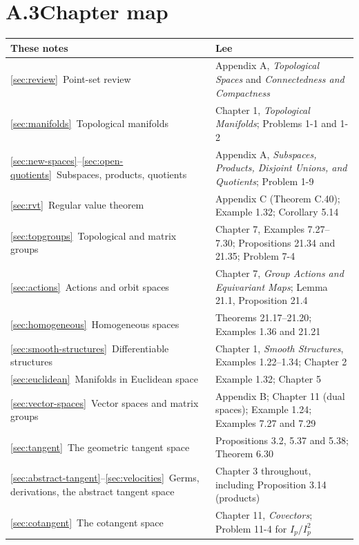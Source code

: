 \documentclass[11pt]{report}
\begin{document}
\section*{A.3\quad Chapter map}

\begin{longtable}{>{\raggedright\arraybackslash}p{6.4cm} >{\raggedright\arraybackslash}p{8.4cm}}
\toprule
\textbf{These notes} & \textbf{Lee} \\ \midrule \endhead
\ref{sec:review}\ Point-set review & Appendix A, \emph{Topological Spaces} and \emph{Connectedness and Compactness} \\
\ref{sec:manifolds}\ Topological manifolds & Chapter 1, \emph{Topological Manifolds}; Problems 1-1 and 1-2 \\
\ref{sec:new-spaces}--\ref{sec:open-quotients}\ Subspaces, products, quotients & Appendix A, \emph{Subspaces, Products, Disjoint Unions, and Quotients}; Problem 1-9 \\
\ref{sec:rvt}\ Regular value theorem & Appendix C (Theorem C.40); Example 1.32; Corollary 5.14 \\
\ref{sec:topgroups}\ Topological and matrix groups & Chapter 7, Examples 7.27--7.30; Propositions 21.34 and 21.35; Problem 7-4 \\
\ref{sec:actions}\ Actions and orbit spaces & Chapter 7, \emph{Group Actions and Equivariant Maps}; Lemma 21.1, Proposition 21.4 \\
\ref{sec:homogeneous}\ Homogeneous spaces & Theorems 21.17--21.20; Examples 1.36 and 21.21 \\
\ref{sec:smooth-structures}\ Differentiable structures & Chapter 1, \emph{Smooth Structures}, Examples 1.22--1.34; Chapter 2 \\
\ref{sec:euclidean}\ Manifolds in Euclidean space & Example 1.32; Chapter 5 \\
\ref{sec:vector-spaces}\ Vector spaces and matrix groups & Appendix B; Chapter 11 (dual spaces); Example 1.24; Examples 7.27 and 7.29 \\
\ref{sec:tangent}\ The geometric tangent space & Propositions 3.2, 5.37 and 5.38; Theorem 6.30 \\
\ref{sec:abstract-tangent}--\ref{sec:velocities}\ Germs, derivations, the abstract tangent space & Chapter 3 throughout, including Proposition 3.14 (products) \\
\ref{sec:cotangent}\ The cotangent space & Chapter 11, \emph{Covectors}; Problem 11-4 for $I_p/I_p^2$ \\

\end{longtable}
\end{document}
